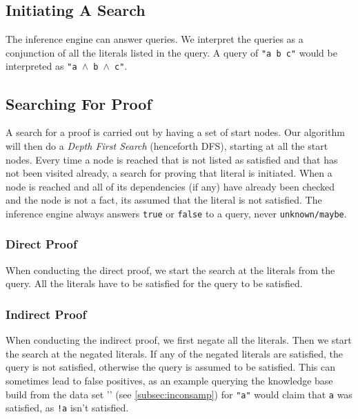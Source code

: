 \documentclass[11pt]{article}
\begin{document}
\subsection{Initiating A Search}
The inference engine can answer queries. We interpret the queries as a conjunction of all the literals listed in the query. A query of {\tt "a b c"} would be interpreted as {\tt "a $\wedge$ b $\wedge$ c"}.

\subsection{Searching For Proof}
A search for a proof is carried out by having a set of start nodes. Our algorithm will then do a \emph{Depth First Search} (henceforth DFS), starting at all the start nodes. Every time a node is reached that is not listed as satisfied and that has not been visited already, a search for proving that literal is initiated. When a node is reached and all of its dependencies (if any) have already been checked and the node is not a fact, its assumed that the literal is not satisfied. The inference engine always answers {\tt true} or {\tt false} to a query, never {\tt unknown/maybe}.

\subsubsection{Direct Proof}
When conducting the direct proof, we start the search at the literals from the query. All the literals have to be satisfied for the query to be satisfied.

\subsubsection{Indirect Proof}
When conducting the indirect proof, we first negate all the literals. Then we start the search at the negated literals. If any of the negated literals are satisfied, the query is not satisfied, otherwise the query is assumed to be satisfied. This can sometimes lead to false positives, as an example querying the knowledge base build from the data set '' (see \ref{subsec:inconsamp}) for {\tt "a"} would claim that {\tt a} was satisfied, as {\tt !a} isn't satisfied.
\end{document}
